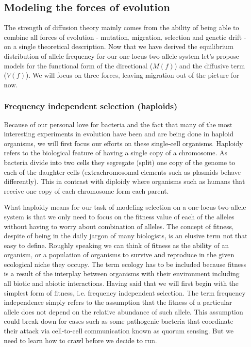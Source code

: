 \subsection{Modeling the forces of evolution}

The strength of diffusion theory mainly comes from the ability of being able to
combine all forces of evolution - mutation, migration, selection and genetic
drift - on a single theoretical description. Now that we have derived the
equilibrium distribution of allele frequency for our one-locus two-allele
system let's propose models for the functional form of the directional ($M(f)$)
and the diffusive term ($V(f)$). We will focus on three forces, leaving
migration out of the picture for now.

\subsubsection{Frequency independent selection (haploids)}

Because of our personal love for bacteria and the fact that many of the most
interesting experiments in evolution have been and are being done in haploid
organisms, we will first focus our efforts on these single-cell organisms.
Haploidy refers to the biological feature of having a single copy of a
chromosome. As bacteria divide into two cells they segregate (split) one copy
of the genome to each of the daughter cells (extrachromosomal elements such as
plasmids behave differently). This in contrast with diploidy where organisms
such as humans that receive one copy of each chromosome form each parent.

What haploidy means for our task of modeling selection on a one-locus
two-allele system is that we only need to focus on the fitness value of each of
the alleles without having to worry about combination of alleles. The concept
of fitness, despite of being in the daily jargon of many biologists, is an
elusive term not that easy to define. Roughly speaking we can think of fitness
as the ability of an organism, or a population of organisms to survive and
reproduce in the given ecological niche they occupy. The term ecology has to be
included because fitness is a result of the interplay between organisms with
their environment including all biotic and abiotic interactions. Having said
that we will first begin with the simplest form of fitness, i.e. frequency
independent selection. The term frequency independence simply refers to the
assumption that the fitness of a particular allele does not depend on the
relative abundance of such allele. This assumption could break down for cases
such as some pathogenic bacteria that coordinate their attack via cell-to-cell
communication known as quorum sensing. But we need to learn how to crawl before
we decide to run.

